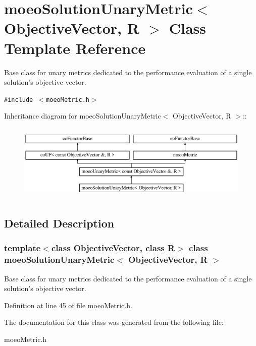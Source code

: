 \section{moeo\-Solution\-Unary\-Metric$<$ Objective\-Vector, R $>$ Class Template Reference}
\label{classmoeoSolutionUnaryMetric}
Base class for unary metrics dedicated to the performance evaluation of a single solution's objective vector.  


{\tt \#include $<$moeo\-Metric.h$>$}

Inheritance diagram for moeo\-Solution\-Unary\-Metric$<$ Objective\-Vector, R $>$::\begin{figure}[H]
\begin{center}
\leavevmode
\includegraphics[height=3.70861cm]{classmoeoSolutionUnaryMetric}
\end{center}
\end{figure}


\subsection{Detailed Description}
\subsubsection*{template$<$class Objective\-Vector, class R$>$ class moeo\-Solution\-Unary\-Metric$<$ Objective\-Vector, R $>$}

Base class for unary metrics dedicated to the performance evaluation of a single solution's objective vector. 



Definition at line 45 of file moeo\-Metric.h.

The documentation for this class was generated from the following file:\begin{CompactItemize}
\item 
moeo\-Metric.h\end{CompactItemize}
